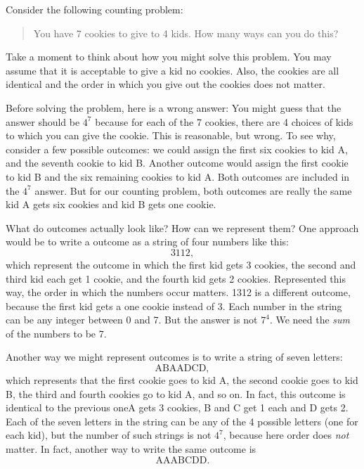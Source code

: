 \documentclass[10pt,]{book}
\theoremstyle{plain}
\theoremstyle{definition}
\theoremstyle{definition}
\theoremstyle{definition}
\numberwithin{equation}{chapter}
\begin{document}
Consider the following counting problem:
%
\begin{quote}
You have 7 cookies to give to 4 kids.  How many ways can you do this?
\end{quote}
\par

Take a moment to think about how you might solve this problem. You may assume that it is acceptable to give a kid no cookies. Also, the cookies are all identical and the order in which you give out the cookies does not matter.
%
\par

Before solving the problem, here is a wrong answer: You might guess that the answer should be \(4^7\) because for each of the 7 cookies, there are 4 choices of kids to which you can give the cookie. This is reasonable, but wrong. To see why, consider a few possible outcomes: we could assign the first six cookies to kid A, and the seventh cookie to kid B. Another outcome would assign the first cookie to kid B and the six remaining cookies to kid A. Both outcomes are included in the \(4^7\) answer. But for our counting problem, both outcomes are really the same \textendash{} kid A gets six cookies and kid B gets one cookie.
%
\par

What do outcomes actually look like? How can we represent them? One approach would be to write a outcome as a string of four numbers like this:
\begin{equation*}
  3112,
\end{equation*}
which represent the outcome in which the first kid gets 3 cookies, the second and third kid each get 1 cookie, and the fourth kid gets 2 cookies. Represented this way, the order in which the numbers occur matters. 1312 is a different outcome, because the first kid gets a one cookie instead of 3. Each number in the string can be any integer between 0 and 7. But the answer is not \(7^4\). We need the \emph{sum} of the numbers to be 7.
%
\par

Another way we might represent outcomes is to write a string of seven letters:
\begin{equation*}
  \mbox{ABAADCD} ,
\end{equation*}
which represents that the first cookie goes to kid A, the second cookie goes to kid B, the third and fourth cookies go to kid A, and so on. In fact, this outcome is identical to the previous one\textemdash{}A gets 3 cookies, B and C get 1 each and D gets 2. Each of the seven letters in the string can be any of the 4 possible letters (one for each kid), but the number of such strings is not \(4^7\), because here order does \emph{not} matter. In fact, another way to write the same outcome is
\begin{equation*}
  \mbox{AAABCDD} .
\end{equation*}
%
\par
\end{document}
